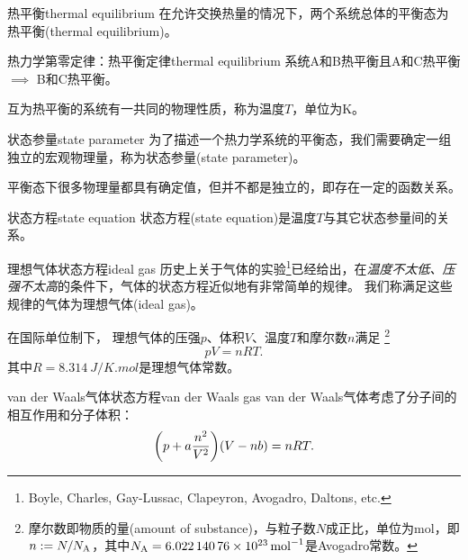 \begin{definition}
	{热平衡}{thermal equilibrium}
	在允许交换热量的情况下，两个系统总体的平衡态为热平衡(thermal equilibrium)。
\end{definition}

\begin{theorem}{热力学第零定律：热平衡定律}{thermal equilibrium}
	系统A和B热平衡且A和C热平衡$\implies$ B和C热平衡。
\end{theorem}

\begin{corollary}
	互为热平衡的系统有一共同的物理性质，称为温度$T$，单位为K。
\end{corollary}

\begin{definition}
	{状态参量}{state parameter}
	为了描述一个热力学系统的平衡态，我们需要确定一组独立的宏观物理量，称为状态参量(state parameter)。
\end{definition}


\begin{remark}
	平衡态下很多物理量都具有确定值，但并不都是独立的，即存在一定的函数关系。
\end{remark}

\begin{definition}{状态方程}{state equation}
	状态方程(state equation)是温度$T$与其它状态参量间的关系。
\end{definition}

\begin{example}
	{理想气体状态方程}{ideal gas}
	历史上关于气体的实验\footnote{Boyle, Charles, Gay-Lussac, Clapeyron, Avogadro, Daltons, etc.}已经给出，在\textit{温度不太低、压强不太高}的条件下，气体的状态方程近似地有非常简单的规律。
	我们称满足这些规律的气体为理想气体(ideal gas)。

	在国际单位制下，
	理想气体的压强$p$、体积$V$、温度$T$和摩尔数$n$满足
	\footnote{摩尔数即物质的量(amount of substance)，与粒子数$N$成正比，单位为mol，即$n:=N/N_{\mathrm A}$，其中$N_{\mathrm A}=\SI{6.02214076e23}{\per\mole}$是Avogadro常数。}
	\begin{equation}
		\label{eq:pV=nRT}
		pV=nRT.
	\end{equation}
	其中$R=\SI{8.314}{J/K.mol}$是理想气体常数。
\end{example}

\begin{example}
	{van der Waals气体状态方程}{van der Waals gas}
	van der Waals气体考虑了分子间的相互作用和分子体积：
	\begin{equation}
		\label{eq:vdW}
		\biggl(p+a\frac{n^2}{V^2}\biggr)(V-nb)=nRT.
	\end{equation}
\end{example}

